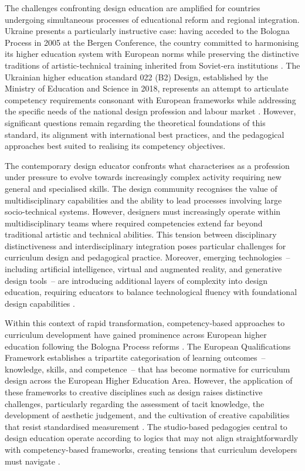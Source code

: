 \documentclass[ed]{acnsart}
\begin{document}
	The challenges confronting design education are amplified for countries undergoing simultaneous processes of educational reform and regional integration. Ukraine presents a particularly instructive case: having acceded to the Bologna Process in 2005 at the Bergen Conference, the country committed to harmonising its higher education system with European norms while preserving the distinctive traditions of artistic-technical training inherited from Soviet-era institutions \cite{Fursa2014}. The Ukrainian higher education standard 022 (B2) Design, established by the Ministry of Education and Science in 2018, represents an attempt to articulate competency requirements consonant with European frameworks while addressing the specific needs of the national design profession and labour market \cite{MON2018}. However, significant questions remain regarding the theoretical foundations of this standard, its alignment with international best practices, and the pedagogical approaches best suited to realising its competency objectives.
	
	The contemporary design educator confronts what \citet{Maia2022105} characterises as a profession under pressure to evolve towards increasingly complex activity requiring new general and specialised skills. The design community recognises the value of multidisciplinary capabilities and the ability to lead processes involving large socio-technical systems. However, designers must increasingly operate within multidisciplinary teams where required competencies extend far beyond traditional artistic and technical abilities. This tension between disciplinary distinctiveness and interdisciplinary integration poses particular challenges for curriculum design and pedagogical practice. Moreover, emerging technologies~-- including artificial intelligence, virtual and augmented reality, and generative design tools~-- are introducing additional layers of complexity into design education, requiring educators to balance technological fluency with foundational design capabilities \cite{Chen2025, Song2025401}.
	
	Within this context of rapid transformation, competency-based approaches to curriculum development have gained prominence across European higher education following the Bologna Process reforms \cite{Castillo2011230}. The European Qualifications Framework establishes a tripartite categorisation of learning outcomes~-- knowledge, skills, and competence~-- that has become normative for curriculum design across the European Higher Education Area. However, the application of these frameworks to creative disciplines such as design raises distinctive challenges, particularly regarding the assessment of tacit knowledge, the development of aesthetic judgement, and the cultivation of creative capabilities that resist standardised measurement \cite{Gehmlich2009736}. The studio-based pedagogies central to design education operate according to logics that may not align straightforwardly with competency-based frameworks, creating tensions that curriculum developers must navigate \cite{Mewburn2012363, Goldschmidt2010285}.
	
\end{document}
